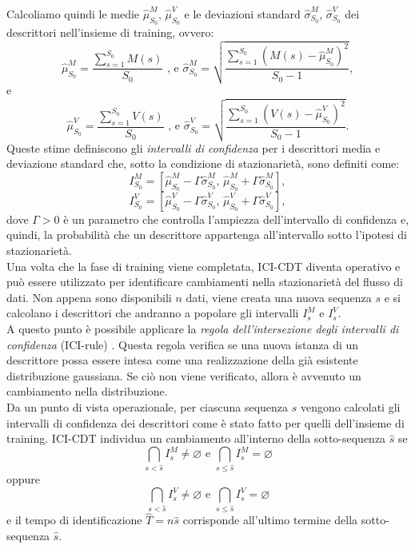 Calcoliamo quindi le medie $\widehat{\mu}^M_{S_0}$, $\widehat{\mu}^V_{S_0}$ e le deviazioni standard $\widehat{\sigma}^M_{S_0}$, $\widehat{\sigma}^V_{S_0}$ dei descrittori nell'insieme di training, ovvero:
\[ \widehat{\mu}^M_{S_0}=\frac{\sum\limits_{s=1}^{S_0}M(s)}{S_0} \text{ , e } \widehat{\sigma}^M_{S_0}=\sqrt{\frac{\sum\limits_{s=1}^{S_0}(M(s)-\widehat{\mu}^M_{S_0})^2}{S_0-1}}, \]
e
\[ \widehat{\mu}^V_{S_0}=\frac{\sum\limits_{s=1}^{S_0}V(s)}{S_0} \text{ , e } \widehat{\sigma}^V_{S_0}=\sqrt{\frac{\sum\limits_{s=1}^{S_0}(V(s)-\widehat{\mu}^V_{S_0})^2}{S_0-1}}. \]
Queste stime definiscono gli \textit{intervalli di confidenza} per i descrittori media e deviazione standard che, sotto la condizione di stazionariet\`a, sono definiti come:
\[I_{S_0}^M= \left[\widehat{\mu}^M_{S_0}-\Gamma \widehat{\sigma}^M_{S_0} \text{, } \widehat{\mu}^M_{S_0}+\Gamma \widehat{\sigma}^M_{S_0}\right], \]
\[I_{S_0}^V= \left[\widehat{\mu}^V_{S_0}-\Gamma \widehat{\sigma}^V_{S_0} \text{, } \widehat{\mu}^V_{S_0}+\Gamma \widehat{\sigma}^V_{S_0}\right], \]
dove $\Gamma>0$ \`e un parametro che controlla l'ampiezza dell'intervallo di confidenza e, quindi, la probabilit\`a che un descrittore appartenga all'intervallo sotto l'ipotesi di stazionariet\`a. \\
Una volta che la fase di training viene completata, ICI-CDT diventa operativo e pu\`o essere utilizzato per identificare cambiamenti nella stazionariet\`a del flusso di dati. Non appena sono disponibili $n$ dati, viene creata una nuova sequenza $s$ e si calcolano i descrittori che andranno a popolare gli intervalli $I_{s}^{M}$ e $I_{s}^{V}$.\\
A questo punto \`e possibile applicare la \textit{regola dell'intersezione degli intervalli di confidenza} (ICI-rule) \cite{goldenshluger1997spatially}. Questa regola verifica se una nuova istanza di un descrittore possa essere intesa come una realizzazione della gi\`a esistente distribuzione gaussiana. Se ci\`o non viene verificato, allora \`e avvenuto un cambiamento nella distribuzione.\\
Da un punto di vista operazionale, per ciascuna sequenza $s$ vengono calcolati gli intervalli di confidenza dei descrittori come \`e stato fatto per quelli dell'insieme di training. ICI-CDT individua un cambiamento all'interno della sotto-sequenza $\widehat{s}$ se
\[\bigcap_{s<\widehat{s}}I_s^M \neq \varnothing \text{ e } \bigcap_{s\leq\widehat{s}}I_s^M = \varnothing \]
oppure
\[\bigcap_{s<\widehat{s}}I_s^V \neq \varnothing \text{ e } \bigcap_{s\leq\widehat{s}}I_s^V = \varnothing \]
e il tempo di identificazione $\widehat{T}=n\widehat{s}$ corrisponde all'ultimo termine della sotto-sequenza $\widehat{s}$.\\
